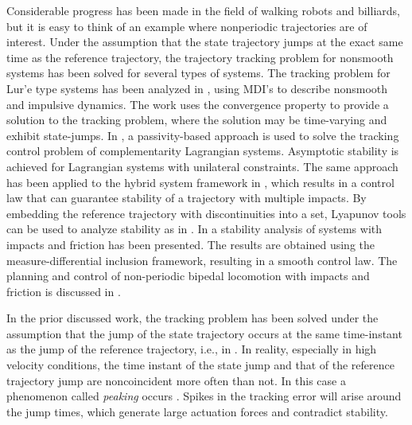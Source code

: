 \documentclass[../DC2017114Bouma.tex]{subfiles}
\begin{document}
Considerable progress has been made in the field of walking robots and billiards, but it is easy to think of an example where nonperiodic trajectories are of interest. Under the assumption that the state trajectory jumps at the exact same time as the reference trajectory, the trajectory tracking problem for nonsmooth systems has been solved for several types of systems. The tracking problem for Lur'e type systems has been analyzed in \cite{VanDeWouw2008,Wouw2010}, using MDI's to describe nonsmooth and impulsive dynamics. The work uses the convergence property to provide a solution to the tracking problem, where the solution may be time-varying and exhibit state-jumps. In \cite{Bourgeot2005}, a passivity-based approach is used to solve the tracking control problem of complementarity Lagrangian systems. Asymptotic stability is achieved for Lagrangian systems with unilateral constraints. The same approach has been applied to the hybrid system framework in \cite{Naldi2013}, which results in a control law that can guarantee stability of a trajectory with multiple impacts. By embedding the reference trajectory with discontinuities into a set, Lyapunov tools can be used to analyze stability as in \cite{Sanfelice2011,Sanfelice2014}. In \cite{Posa2016} a stability analysis of systems with impacts and friction has been presented. The results are obtained using the measure-differential inclusion framework, resulting in a smooth control law. The planning and control of non-periodic bipedal locomotion with impacts and friction is discussed in \cite{Zhao2015a}.

In the prior discussed work, the tracking problem has been solved under the assumption that the jump of the state trajectory occurs at the same time-instant as the jump of the reference trajectory, i.e., in \cite{Naldi2013,Sanfelice2014,Posa2016}. In reality, especially in high velocity conditions, the time instant of the state jump and that of the reference trajectory jump are noncoincident more often than not. In this case a phenomenon called \textit{peaking} occurs \cite{Biemond2013}. Spikes in the tracking error will arise around the jump times, which generate large actuation forces and contradict stability.
\end{document}
